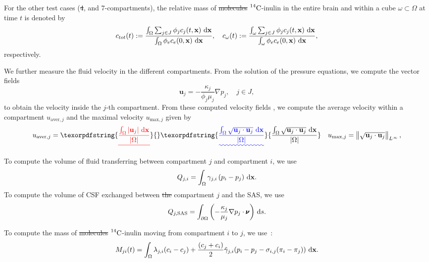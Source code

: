 \documentclass[a4paper,11pt]{article} %
\newcommand{\1}{^{(1)}}
\newcommand{\2}{^{(2)}}
\newcommand*{\dd}{\mathop{\kern0pt\mathrm{d}}\!{}}
\newcommand{\norm}[1]{\left\lVert#1\right\rVert}
\newcommand {\x}   {\mathbf{x}}
\newcommand{\Cinulin}{$\prescript{14}{}{\text{C}}$-inulin }
\providecommand{\DIFaddtex}[1]{{\protect\color{blue}\uwave{#1}}} %
\providecommand{\DIFdeltex}[1]{{\protect\color{red}\sout{#1}}}                      %
\providecommand{\DIFaddbegin}{} %
\providecommand{\DIFaddend}{} %
\providecommand{\DIFdelbegin}{} %
\providecommand{\DIFdelend}{} %
\providecommand{\DIFadd}[1]{\texorpdfstring{\DIFaddtex{#1}}{#1}} %
\providecommand{\DIFdel}[1]{\texorpdfstring{\DIFdeltex{#1}}{}} %
\newcommand{\DIFscaledelfig}{0.5}
\newlength{\DIFdelgraphicswidth} %
\newlength{\DIFdelgraphicsheight} %
\newcommand{\DIFaddincludegraphics}[2][]{{\color{blue}\fbox{\DIFOincludegraphics[#1]{#2}}}} %
\newcommand{\DIFdelincludegraphics}[2][]{%
\sbox{\DIFdelgraphicsbox}{\DIFOincludegraphics[#1]{#2}}%
\settoboxwidth{\DIFdelgraphicswidth}{\DIFdelgraphicsbox} %
\settoboxtotalheight{\DIFdelgraphicsheight}{\DIFdelgraphicsbox} %
\scalebox{\DIFscaledelfig}{%
\parbox[b]{\DIFdelgraphicswidth}{\usebox{\DIFdelgraphicsbox}\\[-\baselineskip] \rule{\DIFdelgraphicswidth}{0em}}\llap{\resizebox{\DIFdelgraphicswidth}{\DIFdelgraphicsheight}{%
\setlength{\unitlength}{\DIFdelgraphicswidth}%
\begin{picture}(1,1)%
\thicklines\linethickness{2pt} %
{\color[rgb]{1,0,0}\put(0,0){\framebox(1,1){}}}%
{\color[rgb]{1,0,0}\put(0,0){\line( 1,1){1}}}%
{\color[rgb]{1,0,0}\put(0,1){\line(1,-1){1}}}%
\end{picture}%
}\hspace*{3pt}}} %
} %
\DeclareRobustCommand{\DIFaddbegin}{\DIFOaddbegin \let\includegraphics\DIFaddincludegraphics} %
\DeclareRobustCommand{\DIFaddend}{\DIFOaddend \let\includegraphics\DIFOincludegraphics} %
\DeclareRobustCommand{\DIFdelbegin}{\DIFOdelbegin \let\includegraphics\DIFdelincludegraphics} %
\DeclareRobustCommand{\DIFdelend}{\DIFOaddend \let\includegraphics\DIFOincludegraphics} %
\begin{document}
For the other test cases (\DIFdelbegin \DIFdel{4}\DIFdelend \DIFaddbegin \DIFadd{4-}\DIFaddend , and 7-compartments), the relative mass of \DIFdelbegin \DIFdel{molecules }\DIFdelend \DIFaddbegin \Cinulin \DIFaddend in the entire brain and within a cube $\omega \subset \Omega$ at time $t$ is denoted by
\[
c_{tot}(t) := \frac{\int_\Omega \sum_{j\in J}  \phi_j c_j(t,\x) \, \dd \x }{ \int_\Omega \phi_e c_e(0,\x) \, \dd \x}, \quad c_{\omega}(t) := \frac{\int_{\omega} \sum_{j\in J} \phi_j c_j(t,\x) \, \dd \x }{ \int_\omega \phi_e c_e(0,\x) \, \dd \x},
\]
respectively. 

We further measure the fluid velocity in the different compartments. From the solution of the pressure equations, we compute the vector fields
\begin{equation}
    \mathbf u_j = -\frac{\kappa_j}{\phi_j \mu_j}\nabla p_j, \quad j\in J, 
    \label{eq:velo}
\end{equation}
to obtain the velocity inside the $j$-th compartment. 
From these computed velocity fields \DIFaddbegin \DIFadd{$\mathbf{u}_j$}\DIFaddend , we compute the average velocity within a compartment $u_{\text{aver},j}$ and the maximal velocity $u_{\text{max},j}$ given by 
\begin{equation}
u_{\text{aver},j} = \DIFdelbegin \DIFdel{\frac{\int_\Omega | \mathbf u_j | \, \dd \x}{| \Omega |}}\DIFdelend \DIFaddbegin \DIFadd{\frac{\int_\Omega \sqrt{\mathbf u_j\cdot\mathbf u_j}  \, \dd \x }{| \Omega |}}\DIFaddend \quad u_{\text{max},j} = \DIFdelbegin %
\DIFdelend \DIFaddbegin \norm{ \sqrt{\mathbf u_j\cdot\mathbf u_j} }\DIFaddend _{L^\infty},
\end{equation}

To compute the volume of fluid transferring between compartment $j$ and compartment $i$, we use
\begin{equation}
Q_{j,i} = \int_{\Omega}  \gamma_{j , i} \left( p_i - p_j \right)\, \dd \x.
\label{eq:compute-transfer}
\end{equation}
To compute the volume of CSF exchanged between \DIFdelbegin \DIFdel{the }\DIFdelend compartment $j$ and the SAS, we use 
\begin{equation}
Q_{j,\text{SAS}} = \int_{\partial \Omega} \left(- \frac{\kappa_j}{ \mu_j}\nabla p_j  \cdot\pmb{\nu}\right) \,\dd s.\label{eq:compute-transfer-SAS}
\end{equation}


To compute the mass of \DIFdelbegin \DIFdel{molecules }\DIFdelend \DIFaddbegin \Cinulin \DIFaddend moving from compartment $i$ to $j$, we use~\cite{jarzynska2006application}: 
\begin{equation}
    M_{ji}(t) = \int_\Omega  \lambda_{j, i}( c_i- c_j) +  \frac{(c_j+c_i)}{2} \tilde \gamma_{j , i} (p_i - p_j-\sigma_{i,j}(\pi_i-\pi_j))  \, \dd \x.
    \label{eq:matrixM}
\end{equation}
\end{document}
